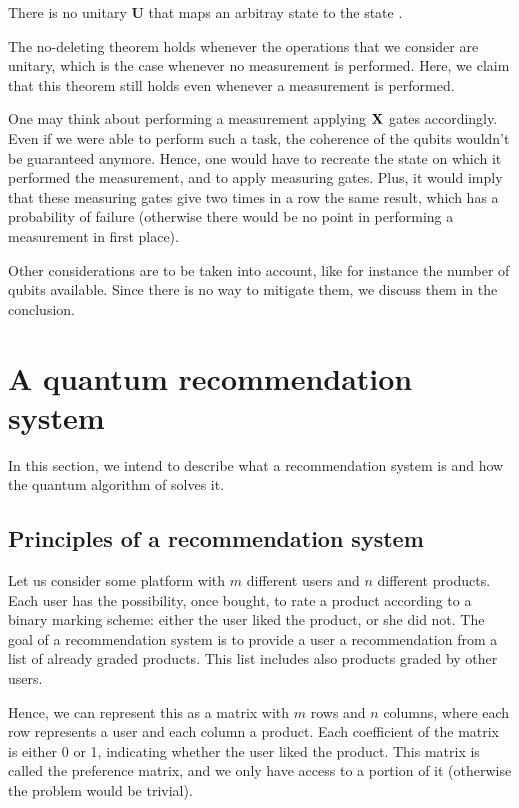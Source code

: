 \documentclass[11pt, a4paper]{article}
\begin{document}
            \begin{theorem}
                There is no unitary \(\mathbf{U}\) that maps an arbitray state \ket{\psi} to the state .
            \end{theorem}
            
            The no-deleting theorem holds whenever the operations that we consider are unitary, which is the case whenever no measurement is performed. Here, we claim that this theorem still holds even whenever a measurement is performed.
            
            One may think about performing a measurement applying \(\mathbf{X}\) gates accordingly. Even if we were able to perform such a task, the coherence of the qubits wouldn't be guaranteed anymore. Hence, one would have to recreate the state on which it performed the measurement, and to apply measuring gates. Plus, it would imply that these measuring gates give two times in a row the same result, which has a probability of failure (otherwise there would be no point in performing a measurement in first place).
            
            Other considerations are to be taken into account, like for instance the number of qubits available. Since there is no way to mitigate them, we discuss them in the conclusion.
    \section{A quantum recommendation system}
        \label{sec:QRS}
        In this section, we intend to describe what a recommendation system is and how the quantum algorithm of \citeauthor{QRS} solves it.
        \subsection{Principles of a recommendation system}
            Let us consider some platform with \(m\) different users and \(n\) different products. Each user has the possibility, once bought, to rate a product according to a binary marking scheme: either the user liked the product, or she did not. The goal of a recommendation system is to provide a user a recommendation from a list of already graded products. This list includes also products graded by other users.
            
            Hence, we can represent this as a matrix with \(m\) rows and \(n\) columns, where each row represents a user and each column a product. Each coefficient of the matrix is either 0 or 1, indicating whether the user liked the product. This matrix is called the preference matrix, and we only have access to a portion of it (otherwise the problem would be trivial).
            
\end{document}
